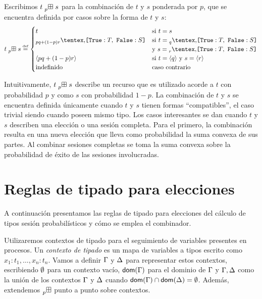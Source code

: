 \begin{definition}
  \label{def:ccomb}
  Escribimos $t \mathrel{\prescript{}{p}{\boxplus}} s$ para la combinación de $t$ y $s$ ponderada por $p$,
	que se encuentra definida por casos sobre la forma de $t$ y $s$:
  \[
    \csum{t}{s}
    \eqdef
    \begin{cases}
      t & \text{si $t = s$}
      \\
      \BinaryPChoice[pq+(1-p)r]{\SessionTypeT}{\SessionTypeS} & \text{si $t = \BinaryPChoice[q]{\SessionTypeT}{\SessionTypeS}$} \\ & \text{y $s = \BinaryPChoice[r]{\SessionTypeT}{\SessionTypeS}$}
      \\
      \ClosedSessionType[pq+(1-p)r] & \text{si $t = \ClosedSessionType[q]$ y $s = \ClosedSessionType[r]$}
      \\
      \text{indefinido} & \text{caso contrario}
    \end{cases}
  \]
\end{definition}

Intuitivamente, $t \mathrel{\prescript{}{p}{\boxplus}} s$ describe un recurso que es utilizado acorde a $t$
con probabilidad $p$ y como $s$ con probabilidad $1 - p$. La combinación de $t$
y $s$ se encuentra definida únicamente cuando $t$ y $s$ tienen formas
``compatibles'', el caso trivial siendo cuando poseen mismo tipo. Los casos
interesantes se dan cuando $t$ y $s$ describen una elección o una sesión
completa. Para el primero, la combinación resulta en una nueva elección que
lleva como probabilidad la suma convexa de sus partes. Al combinar sesiones
completas se toma la suma convexa sobre la probabilidad de éxito de las
sesiones involucradas.

\section{Reglas de tipado para elecciones}

A continuación presentamos las reglas de tipado para elecciones del cálculo de
tipos sesión probabilísticos  y cómo se emplea el
combinador.

Utilizaremos contextos de tipado para el seguimiento de variables presentes en
procesos. Un \emph{contexto de tipado} es un mapa de variables a tipos escrito
como $x_1 : t_1, \dots, x_n : t_n$. Vamos a definir $\Gamma$ y $\Delta$ para
representar estos contextos, escribiendo $\emptyset$ para un contexto vacío,
$\mathsf{dom}(\Gamma)$ para el dominio de $\Gamma$ y $\Gamma, \Delta$ como la unión de
los contextos $\Gamma$ y $\Delta$ cuando $\mathsf{dom}(\Gamma) \cap \mathsf{dom}(\Delta) =
\emptyset$. Además, extendemos $\mathrel{\prescript{}{p}{\boxplus}}$ punto a punto sobre contextos.

